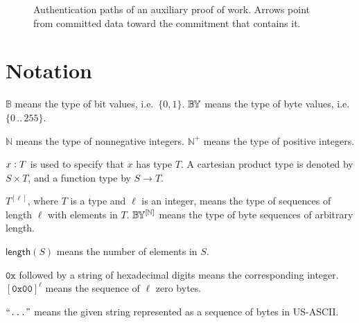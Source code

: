 \documentclass[10pt,letterpaper]{article}
\newcommand\typ{\mathrel{\vcentcolon}}
\newcommand\B{\mathbb{B}}
\newcommand\BY{\mathbb{B}\kern-0.1em\mathbb{Y}}
\newcommand\Nat{\mathbb{N}}
\newcommand\fn[1]{\mathsf{#1}}
\newcommand\ascii[1]{\text{\textquotedblleft\texttt{#1}\textquotedblright}}
\theoremstyle{plain}
\begin{document}
\begin{figure}[H]
\caption{Authentication paths of an auxiliary proof of work. Arrows point from committed data toward the commitment that contains it.}
\label{fig:paths}
\end{figure}

\section{Notation}\label{sec:notation}

$\B$ means the type of bit values, i.e.\ $\{0, 1\}$. $\BY$ means the type of byte values, i.e.\ $\{0\,..\,255\}$.

$\Nat$ means the type of nonnegative integers. $\Nat^+$ means the type of positive integers.

$x \typ T$ is used to specify that $x$ has type $T$. A cartesian product type is denoted by $S \times T$, and a function type by $S \to T$.

$T^{[\ell]}$, where $T$ is a type and $\ell$ is an integer, means the type of sequences of length $\ell$ with elements in $T$. $\BY^{[\Nat]}$ means the type of byte sequences of arbitrary length.

$\fn{length}(S)$ means the number of elements in $S$.

$\mathtt{0x}$ followed by a string of hexadecimal digits means the corresponding integer. $[\mathtt{0x00}]^{\ell}$ means the sequence of $\ell$ zero bytes.

$\ascii{...}$ means the given string represented as a sequence of bytes in US-ASCII.
\end{document}
